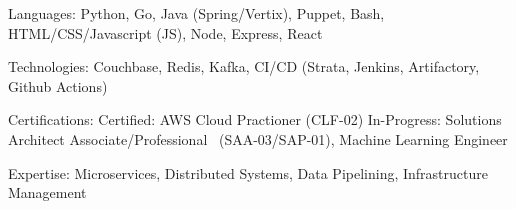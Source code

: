 

\begin{cvparagraph}
Languages: Python, Go, Java (Spring/Vertix), Puppet, Bash, HTML/CSS/Javascript (JS), Node, Express, React


Technologies: Couchbase, Redis, Kafka, CI/CD (Strata, Jenkins, Artifactory, Github Actions)


Certifications: Certified: AWS Cloud Practioner (CLF-02) In-Progress: Solutions Architect Associate/Professional \ (SAA-03/SAP-01), Machine Learning Engineer


Expertise: Microservices, Distributed Systems, Data Pipelining, Infrastructure Management
\end{cvparagraph}
